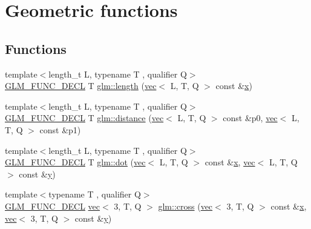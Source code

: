 \hypertarget{group__core__func__geometric}{}\section{Geometric functions}
\label{group__core__func__geometric}
\subsection*{Functions}
\begin{DoxyCompactItemize}
\item 
{\footnotesize template$<$length\+\_\+t L, typename T , qualifier Q$>$ }\\\hyperlink{setup_8hpp_ab2d052de21a70539923e9bcbf6e83a51}{G\+L\+M\+\_\+\+F\+U\+N\+C\+\_\+\+D\+E\+CL} T \hyperlink{group__core__func__geometric_ga0cdabbb000834d994a1d6dc56f8f5263}{glm\+::length} (\hyperlink{structglm_1_1vec}{vec}$<$ L, T, Q $>$ const \&\hyperlink{_s_d_l__opengl_8h_ad0e63d0edcdbd3d79554076bf309fd47}{x})
\item 
{\footnotesize template$<$length\+\_\+t L, typename T , qualifier Q$>$ }\\\hyperlink{setup_8hpp_ab2d052de21a70539923e9bcbf6e83a51}{G\+L\+M\+\_\+\+F\+U\+N\+C\+\_\+\+D\+E\+CL} T \hyperlink{group__core__func__geometric_gaa68de6c53e20dfb2dac2d20197562e3f}{glm\+::distance} (\hyperlink{structglm_1_1vec}{vec}$<$ L, T, Q $>$ const \&p0, \hyperlink{structglm_1_1vec}{vec}$<$ L, T, Q $>$ const \&p1)
\item 
{\footnotesize template$<$length\+\_\+t L, typename T , qualifier Q$>$ }\\\hyperlink{setup_8hpp_ab2d052de21a70539923e9bcbf6e83a51}{G\+L\+M\+\_\+\+F\+U\+N\+C\+\_\+\+D\+E\+CL} T \hyperlink{group__core__func__geometric_gaad6c5d9d39bdc0bf43baf1b22e147a0a}{glm\+::dot} (\hyperlink{structglm_1_1vec}{vec}$<$ L, T, Q $>$ const \&\hyperlink{_s_d_l__opengl_8h_ad0e63d0edcdbd3d79554076bf309fd47}{x}, \hyperlink{structglm_1_1vec}{vec}$<$ L, T, Q $>$ const \&\hyperlink{_s_d_l__opengl_8h_a1675d9d7bb68e1657ff028643b4037e3}{y})
\item 
{\footnotesize template$<$typename T , qualifier Q$>$ }\\\hyperlink{setup_8hpp_ab2d052de21a70539923e9bcbf6e83a51}{G\+L\+M\+\_\+\+F\+U\+N\+C\+\_\+\+D\+E\+CL} \hyperlink{structglm_1_1vec}{vec}$<$ 3, T, Q $>$ \hyperlink{group__core__func__geometric_gaeeec0794212fe84fc9d261de067c9587}{glm\+::cross} (\hyperlink{structglm_1_1vec}{vec}$<$ 3, T, Q $>$ const \&\hyperlink{_s_d_l__opengl_8h_ad0e63d0edcdbd3d79554076bf309fd47}{x}, \hyperlink{structglm_1_1vec}{vec}$<$ 3, T, Q $>$ const \&\hyperlink{_s_d_l__opengl_8h_a1675d9d7bb68e1657ff028643b4037e3}{y})

\end{DoxyCompactItemize}

